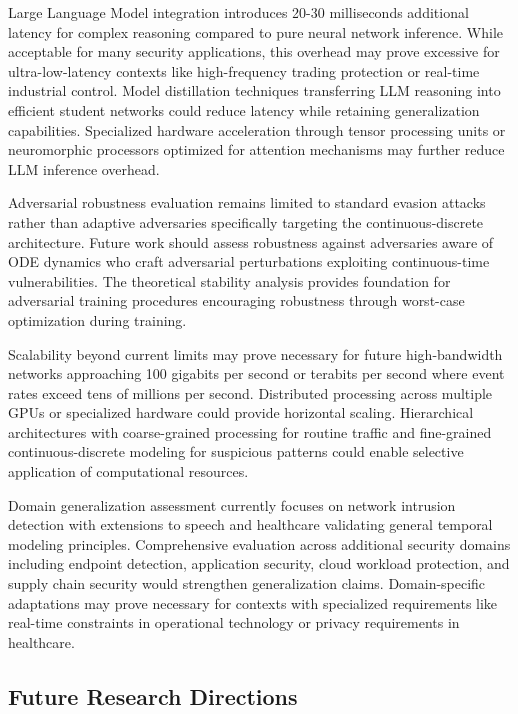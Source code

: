 \documentclass[10pt,journal,compsoc]{IEEEtran}
\begin{document}
Large Language Model integration introduces 20-30 milliseconds additional latency for complex reasoning compared to pure neural network inference. While acceptable for many security applications, this overhead may prove excessive for ultra-low-latency contexts like high-frequency trading protection or real-time industrial control. Model distillation techniques transferring LLM reasoning into efficient student networks could reduce latency while retaining generalization capabilities. Specialized hardware acceleration through tensor processing units or neuromorphic processors optimized for attention mechanisms may further reduce LLM inference overhead.

Adversarial robustness evaluation remains limited to standard evasion attacks rather than adaptive adversaries specifically targeting the continuous-discrete architecture. Future work should assess robustness against adversaries aware of ODE dynamics who craft adversarial perturbations exploiting continuous-time vulnerabilities. The theoretical stability analysis provides foundation for adversarial training procedures encouraging robustness through worst-case optimization during training.

Scalability beyond current limits may prove necessary for future high-bandwidth networks approaching 100 gigabits per second or terabits per second where event rates exceed tens of millions per second. Distributed processing across multiple GPUs or specialized hardware could provide horizontal scaling. Hierarchical architectures with coarse-grained processing for routine traffic and fine-grained continuous-discrete modeling for suspicious patterns could enable selective application of computational resources.

Domain generalization assessment currently focuses on network intrusion detection with extensions to speech and healthcare validating general temporal modeling principles. Comprehensive evaluation across additional security domains including endpoint detection, application security, cloud workload protection, and supply chain security would strengthen generalization claims. Domain-specific adaptations may prove necessary for contexts with specialized requirements like real-time constraints in operational technology or privacy requirements in healthcare.

\subsection{Future Research Directions}
\end{document}
